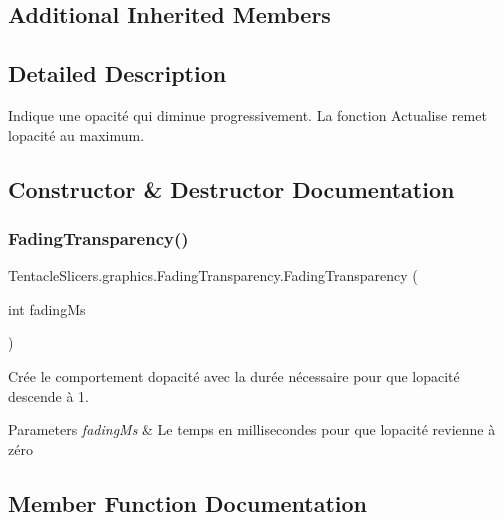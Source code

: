 \subsection*{Additional Inherited Members}


\subsection{Detailed Description}
Indique une opacité qui diminue progressivement. La fonction Actualise remet l\textquotesingle{}opacité au maximum. 



\subsection{Constructor \& Destructor Documentation}
\mbox{\label{class_tentacle_slicers_1_1graphics_1_1_fading_transparency_a1327bc9549046d3b5562d0e92b742129}} 
\subsubsection{\texorpdfstring{Fading\+Transparency()}{FadingTransparency()}}
{\footnotesize\ttfamily Tentacle\+Slicers.\+graphics.\+Fading\+Transparency.\+Fading\+Transparency (\begin{DoxyParamCaption}\item[{int}]{fading\+Ms }\end{DoxyParamCaption})}



Crée le comportement d\textquotesingle{}opacité avec la durée nécessaire pour que l\textquotesingle{}opacité descende à 1. 


\begin{DoxyParams}{Parameters}
{\em fading\+Ms} & Le temps en millisecondes pour que l\textquotesingle{}opacité revienne à zéro \\
\hline
\end{DoxyParams}


\subsection{Member Function Documentation}
\mbox{\label{class_tentacle_slicers_1_1graphics_1_1_fading_transparency_a7fb444b5436abb825cdf7570e937b345}} 
